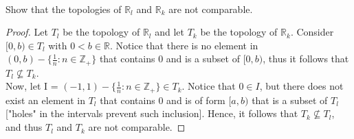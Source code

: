 \documentclass[12pt]{article}
\newenvironment{problem}[2][Problem]
{
	\begin{trivlist} 
		\item[\hskip \labelsep {\bfseries #1 #2:}]
	}
{
	\end{trivlist}
	}
\begin{document}
\newpage

\begin{problem}{13.6} \ \\
Show that the topologies of \(\mathbb{R}_l\) and \(\mathbb{R}_k\) are not comparable.
\end{problem}

\begin{proof}
Let \(T_l\) be the topology of \(\mathbb{R}_l\) and let \(T_k\) be the topology of \(\mathbb{R}_k\). Consider \([0, b) \in T_l\) with \(0 < b \in \mathbb{R}\). Notice that there is no element in \((0, b) - \{\frac{1}{n} : n \in \mathbb{Z}_+\}\) that contains \(0\) and is a subset of \([0, b)\), thus it follows that \(T_l \not \subseteq T_k\). \newline \\
Now, let I = \((-1, 1) - \{\frac{1}{n} : n \in \mathbb{Z}_+\} \in T_k\). Notice that \(0 \in I\), but there does not exist an element in \(T_l\) that contains \(0\) and is of form \([a, b)\) that is a subset of \(T_l\) ["holes" in the intervals prevent such inclusion]. Hence, it follows that \(T_k \not \subseteq T_l\), and thus \(T_l\) and \(T_k\) are not comparable. 
\end{proof}
\end{document}

